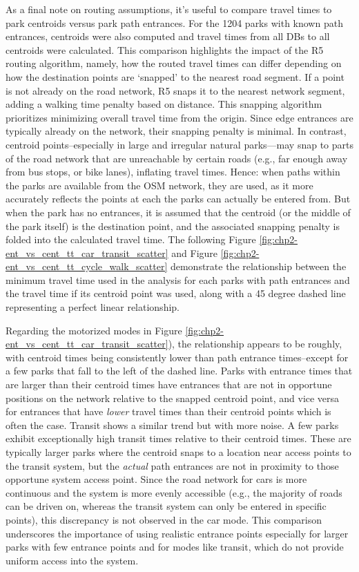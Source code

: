 \documentclass[
11pt, %
oneside, %
english, %
singlespacing, %
]{macthesis} %
\begin{document}
As a final note on routing assumptions, it's useful to compare travel times to park centroids versus park path entrances. For the 1204 parks with known path entrances, centroids were also computed and travel times from all DBs to all centroids were calculated. This comparison highlights the impact of the R5 routing algorithm, namely, how the routed travel times can differ depending on how the destination points are `snapped' to the nearest road segment. If a point is not already on the road network, R5 snaps it to the nearest network segment, adding a walking time penalty based on distance. This snapping algorithm prioritizes minimizing overall travel time from the origin. Since edge entrances are typically already on the network, their snapping penalty is minimal. In contrast, centroid points--especially in large and irregular natural parks---may snap to parts of the road network that are unreachable by certain roads (e.g., far enough away from bus stops, or bike lanes), inflating travel times. Hence: when paths within the parks are available from the OSM network, they are used, as it more accurately reflects the points at each the parks can actually be entered from. But when the park has no entrances, it is assumed that the centroid (or the middle of the park itself) is the destination point, and the associated snapping penalty is folded into the calculated travel time. The following Figure \ref{fig:chp2-ent_vs_cent_tt_car_transit_scatter} and Figure \ref{fig:chp2-ent_vs_cent_tt_cycle_walk_scatter} demonstrate the relationship between the minimum travel time used in the analysis for each parks with path entrances and the travel time if its centroid point was used, along with a 45 degree dashed line representing a perfect linear relationship.

Regarding the motorized modes in Figure \ref{fig:chp2-ent_vs_cent_tt_car_transit_scatter}), the relationship appears to be roughly, with centroid times being consistently lower than path entrance times--except for a few parks that fall to the left of the dashed line. Parks with entrance times that are larger than their centroid times have entrances that are not in opportune positions on the network relative to the snapped centroid point, and vice versa for entrances that have \emph{lower} travel times than their centroid points which is often the case. Transit shows a similar trend but with more noise. A few parks exhibit exceptionally high transit times relative to their centroid times. These are typically larger parks where the centroid snaps to a location near access points to the transit system, but the \emph{actual} path entrances are not in proximity to those opportune system access point. Since the road network for cars is more continuous and the system is more evenly accessible (e.g., the majority of roads can be driven on, whereas the transit system can only be entered in specific points), this discrepancy is not observed in the car mode. This comparison underscores the importance of using realistic entrance points especially for larger parks with few entrance points and for modes like transit, which do not provide uniform access into the system.
\end{document}
